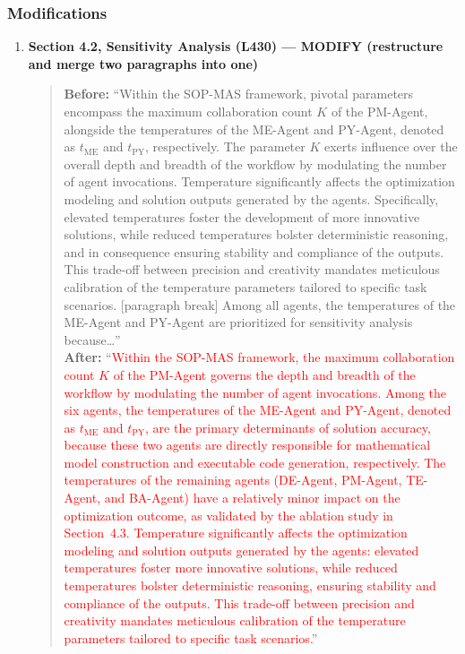 \documentclass[11pt,a4paper]{article}
\begin{document}
\subsubsection{Modifications}
\begin{enumerate}
\item \textbf{Section 4.2, Sensitivity Analysis (L430) --- MODIFY (restructure and merge two paragraphs into one)}
\begin{quote}
\textbf{Before:} ``Within the SOP-MAS framework, pivotal parameters encompass the maximum collaboration count $K$ of the PM-Agent, alongside the temperatures of the ME-Agent and PY-Agent, denoted as $t_\text{ME}$ and $t_\text{PY}$, respectively. The parameter $K$ exerts influence over the overall depth and breadth of the workflow by modulating the number of agent invocations. Temperature significantly affects the optimization modeling and solution outputs generated by the agents. Specifically, elevated temperatures foster the development of more innovative solutions, while reduced temperatures bolster deterministic reasoning, and in consequence ensuring stability and compliance of the outputs. This trade-off between precision and creativity mandates meticulous calibration of the temperature parameters tailored to specific task scenarios. [paragraph break] Among all agents, the temperatures of the ME-Agent and PY-Agent are prioritized for sensitivity analysis because\dots''\\[4pt]
\textbf{After:} ``\textcolor{red}{Within the SOP-MAS framework, the maximum collaboration count $K$ of the PM-Agent governs the depth and breadth of the workflow by modulating the number of agent invocations. Among the six agents, the temperatures of the ME-Agent and PY-Agent, denoted as $t_\text{ME}$ and $t_\text{PY}$, are the primary determinants of solution accuracy, because these two agents are directly responsible for mathematical model construction and executable code generation, respectively. The temperatures of the remaining agents (DE-Agent, PM-Agent, TE-Agent, and BA-Agent) have a relatively minor impact on the optimization outcome, as validated by the ablation study in Section~4.3. Temperature significantly affects the optimization modeling and solution outputs generated by the agents: elevated temperatures foster more innovative solutions, while reduced temperatures bolster deterministic reasoning, ensuring stability and compliance of the outputs. This trade-off between precision and creativity mandates meticulous calibration of the temperature parameters tailored to specific task scenarios.}''
\end{quote}
\end{enumerate}
\end{document}
